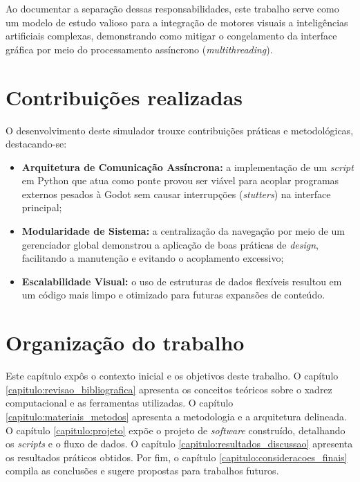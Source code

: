 Ao documentar a separação dessas responsabilidades, este trabalho serve como um modelo de estudo valioso para a integração de motores visuais a inteligências artificiais complexas, demonstrando como mitigar o congelamento da interface gráfica por meio do processamento assíncrono (\textit{multithreading}).

\section{Contribuições realizadas}

O desenvolvimento deste simulador trouxe contribuições práticas e metodológicas, destacando-se:

\begin{itemize}
	\item \textbf{Arquitetura de Comunicação Assíncrona:} a implementação de um \textit{script} em Python que atua como ponte provou ser viável para acoplar programas externos pesados à Godot sem causar interrupções (\textit{stutters}) na interface principal;
	\item \textbf{Modularidade de Sistema:} a centralização da navegação por meio de um gerenciador global demonstrou a aplicação de boas práticas de \textit{design}, facilitando a manutenção e evitando o acoplamento excessivo;
	\item \textbf{Escalabilidade Visual:} o uso de estruturas de dados flexíveis resultou em um código mais limpo e otimizado para futuras expansões de conteúdo.
\end{itemize}

\section{Organização do trabalho}

Este capítulo expôs o contexto inicial e os objetivos deste trabalho. 
O capítulo \ref{capitulo:revisao_bibliografica} apresenta os conceitos teóricos sobre o xadrez computacional e as ferramentas utilizadas. 
O capítulo \ref{capitulo:materiais_metodos} apresenta a metodologia e a arquitetura delineada. 
O capítulo \ref{capitulo:projeto} expõe o projeto de \textit{software} construído, detalhando os \textit{scripts} e o fluxo de dados. 
O capítulo \ref{capitulo:resultados_discussao} apresenta os resultados práticos obtidos. 
Por fim, o capítulo \ref{capitulo:consideracoes_finais} compila as conclusões e sugere propostas para trabalhos futuros.
